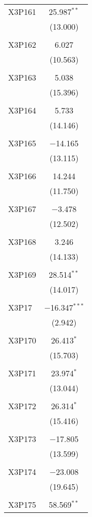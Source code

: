 \begin{table}[!htbp]
\begin{tabular}{@{\extracolsep{5pt}}lc}
 X3P161 & 25.987$^{**}$ \\ 
  & (13.000) \\ 
  & \\ 
 X3P162 & 6.027 \\ 
  & (10.563) \\ 
  & \\ 
 X3P163 & 5.038 \\ 
  & (15.396) \\ 
  & \\ 
 X3P164 & 5.733 \\ 
  & (14.146) \\ 
  & \\ 
 X3P165 & $-$14.165 \\ 
  & (13.115) \\ 
  & \\ 
 X3P166 & 14.244 \\ 
  & (11.750) \\ 
  & \\ 
 X3P167 & $-$3.478 \\ 
  & (12.502) \\ 
  & \\ 
 X3P168 & 3.246 \\ 
  & (14.133) \\ 
  & \\ 
 X3P169 & 28.514$^{**}$ \\ 
  & (14.017) \\ 
  & \\ 
 X3P17 & $-$16.347$^{***}$ \\ 
  & (2.942) \\ 
  & \\ 
 X3P170 & 26.413$^{*}$ \\ 
  & (15.703) \\ 
  & \\ 
 X3P171 & 23.974$^{*}$ \\ 
  & (13.044) \\ 
  & \\ 
 X3P172 & 26.314$^{*}$ \\ 
  & (15.416) \\ 
  & \\ 
 X3P173 & $-$17.805 \\ 
  & (13.599) \\ 
  & \\ 
 X3P174 & $-$23.008 \\ 
  & (19.645) \\ 
  & \\ 
 X3P175 & 58.569$^{**}$ \\ 

\end{tabular}
\end{table}

